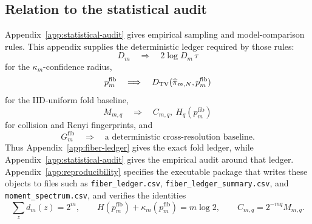 \subsection{Relation to the statistical audit}

Appendix~\ref{app:statistical-audit} gives empirical sampling and model-comparison rules.  This appendix supplies the deterministic ledger required by those rules:
\[
D_m
\quad\Longrightarrow\quad
2\log D_m\,\tau
\]
for the \(\kappa_m\)-confidence radius,
\[
p_m^{\mathrm{fib}}
\quad\Longrightarrow\quad
D_{\mathrm{TV}}(\widehat\pi_{m,N},p_m^{\mathrm{fib}})
\]
for the IID-uniform fold baseline,
\[
M_{m,q}
\quad\Longrightarrow\quad
C_{m,q},\ H_q(p_m^{\mathrm{fib}})
\]
for collision and Renyi fingerprints, and
\[
G_m^{\mathrm{fib}}
\quad\Longrightarrow\quad
\text{a deterministic cross-resolution baseline}.
\]
Thus Appendix~\ref{app:fiber-ledger} gives the exact fold ledger, while Appendix~\ref{app:statistical-audit} gives the empirical audit around that ledger.  Appendix~\ref{app:reproducibility} specifies the executable package that writes these objects to files such as \texttt{fiber\_ledger.csv}, \texttt{fiber\_ledger\_summary.csv}, and \texttt{moment\_spectrum.csv}, and verifies the identities
\[
\sum_zd_m(z)=2^m,\qquad
H(p_m^{\mathrm{fib}})+\kappa_m(p_m^{\mathrm{fib}})=m\log2,\qquad
C_{m,q}=2^{-mq}M_{m,q}.
\]
